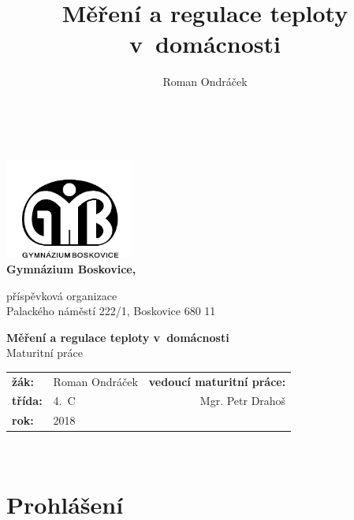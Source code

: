 \documentclass[12pt,a4paper]{article}
\author{Roman Ondráček}
\title{Měření a regulace teploty v~domácnosti}
\begin{document}
\renewcommand{\baselinestretch}{1.5}
\pagestyle{empty}

\begin{center}

~ \vspace{64pt}

\includegraphics[width = 160px]{img/gymbos-logo.png}  \\[8pt]

{\LARGE \textbf{Gymnázium Boskovice,} \\}

\begin{large}
příspěvková organizace \\
Palackého náměstí 222/1, Boskovice 680 11 \\
\end{large}

\vspace{64pt}

{\huge \textbf{Měření a regulace teploty v~domácnosti} \\}
{\LARGE Maturitní práce \\}

\vspace{64pt}

\begin{large}
\begin{tabular}{llr}
\textbf{žák:} & Roman Ondráček & \textbf{vedoucí maturitní práce:} \\
\textbf{třída:} & 4.~C & Mgr. Petr Drahoš \\
\textbf{rok:} & 2018 &  \\
\end{tabular}
\end{large}

\end{center}

\newpage

~ \vspace{160mm}

\section*{Prohlášení}
\end{document}

